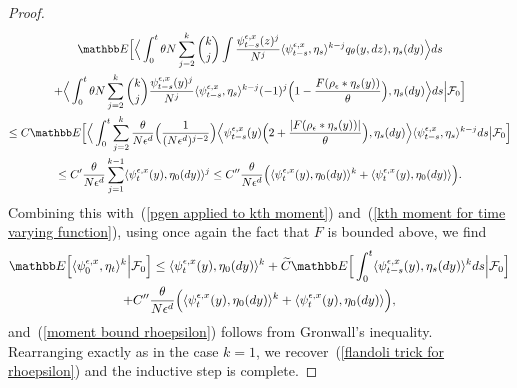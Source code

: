 \documentclass[EJP]{ejpecp} %
\renewcommand{\tilde}{\widetilde}
\newcommand{\IE}{\mathbb E}
\begin{document}
\begin{proof}
\begin{multline*}
\IE\Big[
\Big\langle
\int_0^t\theta N\sum_{j=2}^{k}\binom{k}{j}\int
\frac{\psi_{t-s}^{\epsilon,x}(z)^j}{N^j}
\langle \psi^{\epsilon,x}_{t-s},\eta_s\rangle^{k-j}
q_\theta(y,dz),
\eta_s(dy)\Big\rangle ds 
\\
+
\Big\langle \int_0^t\theta N\sum_{j=2}^{k}\binom{k}{j}\frac{\psi_{t-s}^{\epsilon,x}(y)^j}{N^j}\langle \psi^{\epsilon,x}_{t-s},\eta_s\rangle^{k-j}
(-1)^j\Big(1-\frac{F(\rho_\epsilon*\eta_s(y))}{\theta} 
\Big),
\eta_s(dy)\Big\rangle ds\Big|{\cal F}_0\Big]
\\
\leq 
C\IE\Big[\Big\langle\int_0^t\sum_{j=2}^k\frac{\theta}{N\epsilon^d}
\Big(\frac{1}{(N\epsilon^d)^{j-2}}\Big)
	\Big\langle \psi^{\epsilon,x}_{t-s}(y)
\Big(2+\frac{|F(\rho_\epsilon*\eta_s(y))|}{\theta}\Big),\eta_s(dy)\Big\rangle
\langle\psi^{\epsilon,x}_{t-s},\eta_s\rangle^{k-j}ds\big|{\cal F}_0\Big]
\\
\leq
C'\frac{\theta}{N\epsilon^d}\sum_{j=1}^{k-1}
\langle\psi^{\epsilon, x}_t(y),\eta_0(dy)\rangle^j
\leq
C''\frac{\theta}{N\epsilon^d}
\Big(\langle\psi^{\epsilon, x}_t(y),\eta_0(dy)\rangle^k
+\langle\psi^{\epsilon, x}_t(y),\eta_0(dy)\rangle\Big).
\end{multline*}
Combining this with~(\ref{pgen applied to kth moment})
and~(\ref{kth moment for time varying function}), using once again the fact that $F$
is bounded above, we find 
\begin{multline*}
\label{kth step of induction}
\IE\Big[\langle \psi^{\epsilon,x}_0,\eta_t\rangle^k\Big|{\cal F}_0\Big]
\leq
\langle\psi^{\epsilon, x}_t(y),\eta_0(dy)\rangle^k
+\tilde{C}\IE\Big[\int_0^t
\langle\psi^{\epsilon, x}_{t-s}(y),\eta_s(dy)\rangle^k ds
\Big|{\cal F}_0\Big]
\\
+C''\frac{\theta}{N\epsilon^d}
\Big(\langle\psi^{\epsilon, x}_t(y),\eta_0(dy)\rangle^k+
\langle\psi^{\epsilon, x}_t(y),\eta_0(dy)\rangle\Big)
,
\end{multline*}
and~(\ref{moment bound rhoepsilon}) 
follows from Gronwall's inequality. Rearranging exactly as in the case $k=1$, we 
recover~(\ref{flandoli trick for rhoepsilon}) 
and the inductive step is complete.
\end{proof}
\end{document}
